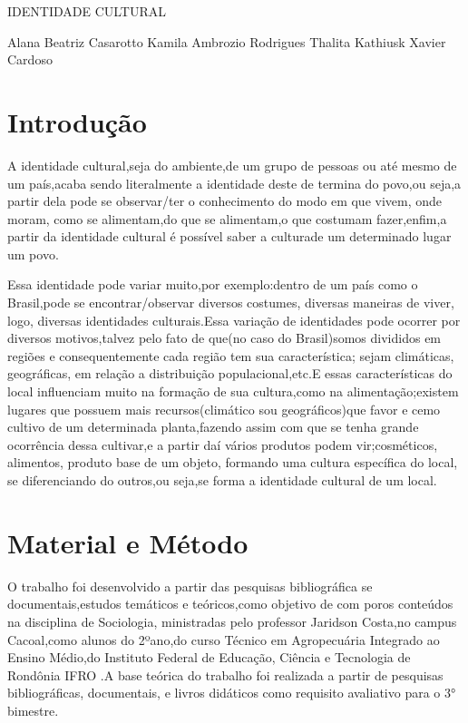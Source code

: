 \documentclass[article,12pt,onesidea,4paper,english,brazil]{abntex2}
\begin{document}
	
	
	\frenchspacing 
	
	\begin{center}
		\LARGE IDENTIDADE CULTURAL
		
		\normalsize
		Alana Beatriz Casarotto
	Kamila Ambrozio Rodrigues
		Thalita Kathiusk Xavier Cardoso 
	
	\end{center}
	


	
	\section*{Introdução}
	

A identidade cultural,seja do ambiente,de um grupo de pessoas ou até mesmo de um país,acaba sendo literalmente a identidade deste de termina do povo,ou seja,a partir dela pode se observar/ter o conhecimento do modo em que vivem, onde moram, como se alimentam,do que se alimentam,o que costumam fazer,enfim,a partir da identidade cultural é possível saber a culturade um determinado lugar um povo.

Essa identidade pode variar muito,por exemplo:dentro de um país como o Brasil,pode se encontrar/observar diversos costumes, diversas maneiras de viver, logo, diversas identidades culturais.Essa variação de identidades pode ocorrer por diversos motivos,talvez pelo fato de que(no caso do Brasil)somos divididos em regiões e consequentemente cada região tem sua característica; sejam climáticas, geográficas, em relação a distribuição populacional,etc.E essas características do local influenciam muito na formação de sua cultura,como na alimentação;existem lugares que possuem mais recursos(climático sou geográficos)que favor e cemo cultivo de um determinada planta,fazendo assim com que se tenha grande ocorrência dessa cultivar,e a partir daí vários produtos podem vir;cosméticos, alimentos, produto base de um objeto, formando uma cultura específica do local, se diferenciando do outros,ou seja,se forma a identidade cultural de um local.
	
	\section*{Material e Método}
	
O trabalho foi desenvolvido a partir das pesquisas bibliográfica se documentais,estudos temáticos e teóricos,como objetivo de com poros conteúdos na disciplina de Sociologia, ministradas pelo professor Jaridson Costa,no campus Cacoal,como alunos do 2ºano,do curso Técnico em Agropecuária Integrado ao Ensino Médio,do Instituto Federal de Educação, Ciência e Tecnologia de Rondônia IFRO .A base teórica do trabalho foi realizada a partir de pesquisas bibliográficas, documentais, e livros didáticos como requisito avaliativo para o 3° bimestre.
	
\end{document}
